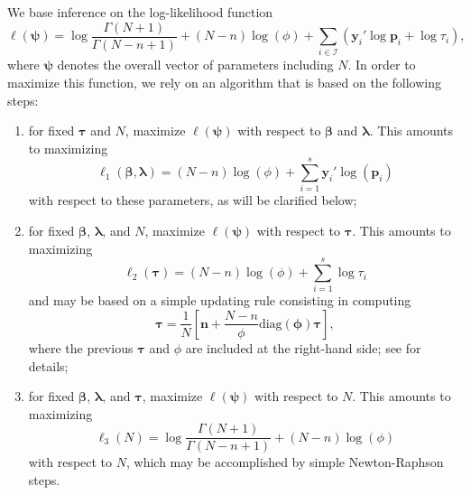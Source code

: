 We base inference on the log-likelihood function
\[
\ell(\bm\psi) = \log\frac{\Gamma(N+1)}{\Gamma(N-n+1)}+(N-n)\log(\phi)+\sum_{i\in\mathcal{I}}(\bm{y}_i'\log\bm{p}_i+\log \tau_i),
\]
where $\bm\psi$ denotes the overall vector of parameters including $N$.
In order to maximize this function, we rely on an algorithm that is based on the following steps:
%
\begin{enumerate}
%
\item for fixed $\bm{\tau}$ and $N$, maximize $\ell(\bm\psi)$ with respect to $\bm{\beta}$ and $\bm{\lambda}$.
This amounts to maximizing
\begin{equation}\label{eq:l1}
\ell_1(\bm{\beta},\bm{\lambda}) =(N-n)\log(\phi)+ \sum_{i=1}^s \bm{y}_i'\log(\bm{p}_i)
\end{equation}
with respect to these parameters, as will be clarified below;
%
\item for fixed $\bm{\beta}$, $\bm{\lambda}$, and $N$, maximize $\ell(\bm\psi)$ with respect to $\bm{\tau}$.
This amounts to maximizing
\[
\ell_2(\bm{\tau}) = (N-n)\log(\phi)+\sum_{i=1}^s\log \tau_i
\]
and may be based on a simple updating rule consisting in computing
\[
\bm{\tau} = \frac{1}{N}\left[\bm{n}+\frac{N-n}{\phi}\text{diag}(\bm\phi)\bm{\tau}\right],
\]
where the previous $\bm{\tau}$ and $\phi$ are included at the right-hand side; see \cite{bartolucci2024estimating} for details;
%
\item for fixed $\bm{\beta}$, $\bm{\lambda}$, and $\bm{\tau}$, maximize $\ell(\bm\psi)$ with respect to $N$.
This amounts to maximizing
\[
\ell_3(N) = \log\frac{\Gamma(N+1)}{\Gamma(N-n+1)}+(N-n)\log(\phi)
\]
with respect to $N$, which may be accomplished by simple Newton-Raphson steps.
%
\end{enumerate}

